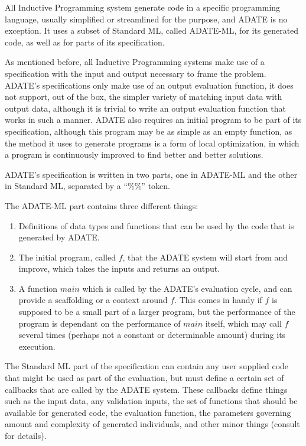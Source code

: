 All Inductive Programming system generate code in a specific programming
language, usually simplified or streamlined for the purpose, and ADATE is no
exception. It uses a subset of Standard ML, called ADATE-ML, for its generated
code, as well as for parts of its specification.

As mentioned before, all Inductive Programming systems make use of a
specification with the input and output necessary to frame the problem. ADATE's
specifications only make use of an output evaluation function, it does not
support, out of the box, the simpler variety of matching input data with output
data, although it is trivial to write an output evaluation function that works
in such a manner. ADATE also requires an initial program to be part of its
specification, although this program may be as simple as an empty function, as
the method it uses to generate programs is a form of local optimization, in
which a program is continuously improved to find better and better solutions.

ADATE's specification is written in two parts, one in ADATE-ML and the other in
Standard ML, separated by a ``\%\%'' token.

The ADATE-ML part contains three different things:
\begin{enumerate}
\item Definitions of data types and functions that can be used by the code that
  is generated by ADATE.
\item The initial program, called \(f\), that the ADATE system will start from
  and improve, which takes the inputs and returns an output.
\item A function \(main\) which is called by the ADATE's evaluation cycle, and
  can provide a scaffolding or a context around \(f\). This comes in handy
  if \(f\) is supposed to be a small part of a larger program, but the
  performance of the program is dependant on the performance of \(main\)
  itself, which may call \(f\) several times (perhaps not a constant or
  determinable amount) during its execution.
\end{enumerate}

The Standard ML part of the specification can contain any user supplied code
that might be used as part of the evaluation, but must define a certain set of
callbacks that are called by the ADATE system. These callbacks define things
such as the input data, any validation inputs, the set of functions that should
be available for generated code, the evaluation function, the parameters
governing amount and complexity of generated individuals, and other minor things
(consult \citet[sect.~4.2]{vattekar2006adate} for details).

